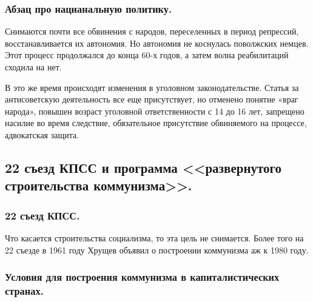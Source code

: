 \subsubsection{\textbf{Абзац про нацианальную политику.}}
Снимаются почти все обвинения с народов, переселенных в период репрессий, восстанавливается их автономия. Но автономия не коснулась поволжских немцев. Этот процесс продолжался до конца 60-х годов, а затем волна реабилитаций сходила на нет.

В это же время происходят изменения в уголовном законодательстве. Статья за антисоветскую деятельность все еще присутствует, но отменено понятие «враг народа», повышен возраст уголовной ответственности с 14 до 16 лет, запрещено насилие во время следствие, обязательное присутствие обвиняемого на процессе, адвокатская защита.

\subsection{22 съезд КПСС и программа <<развернутого строительства коммунизма>>.}

\subsubsection{\textbf{22 съезд КПСС.}}

Что касается строительства социализма, то эта цель не снимается. Более того на 22 съезде в 1961 году Хрущев объявил о построении коммунизма аж к 1980 году. 

\subsubsection{\textbf{Условия для построения коммунизма в капиталистических странах.}}

